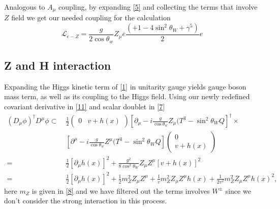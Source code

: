\documentclass{report}
\numberwithin{equation}{section}
\begin{document}
Analogous to $A_\mu$ coupling, by expanding \eqref{5} and collecting the terms that involve $Z$ field we get our needed coupling for the calculation
\begin{equation}
    \mathcal{L}_{e-Z}=\frac{g}{2\cos\theta_w}Z_\mu \overline{e}\frac{(+1-4 \sin^2\theta_W+\gamma^5)}{2}e\label{11}
\end{equation}


\subsection{Z and H interaction}
Expanding the Higgs kinetic term of \eqref{1} in unitarity gauge yields gauge boson mass term, as well as its coupling to the Higgs field. Using our newly redefined covariant derivative in \eqref{11} and scalar doublet in \eqref{7}
\begin{equation}
\begin{split}
(D_\mu\phi)^\dagger D^\mu \phi\subset\ &\frac{1}{2}\begin{pmatrix}
0 & v+h(x)
\end{pmatrix}
\left[\partial_\mu - i\frac{g}{\cos \theta_w}Z_\mu(T^3-\sin^2 \theta_W Q\right]^\dagger \times
\\ &\left[\partial^\mu - i\frac{g}{\cos \theta_w}Z^\mu(T^3-\sin^2 \theta_W Q\right]\begin{pmatrix}
0\\
v+h(x)
\end{pmatrix}\\
=&\frac{1}{2}[\partial_\mu h(x)]^2+\frac{g^2}{8\cos^2 \theta_W}Z_\mu Z^\mu\left[v+h(x)\right]^2\\
=&\frac{1}{2}[\partial_\mu h(x)]^2+\frac{1}{2}m_Z^2Z_\mu Z^\mu+\frac{1}{v} m_Z^2Z_\mu Z^\mu h(x)+\frac{1}{2v^2}m_Z^2 Z_\mu Z^\mu h(x)^2\label{10},
\end{split}
\end{equation}
here $m_Z$ is given in \eqref{8} and we have filtered out the terms involves $W^\pm$ since we don't consider the strong interaction in this process.
\end{document}
